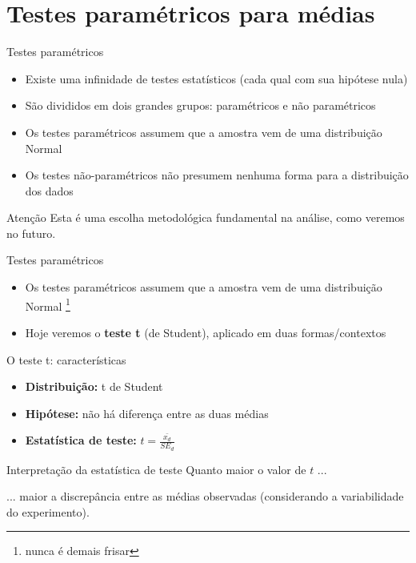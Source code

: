 \documentclass{beamer}
\begin{document}
\section{Testes paramétricos para médias}

\begin{frame}{\scriptsize Testes paramétricos}
  \begin{itemize}
    \footnotesize
  \item Existe uma infinidade de testes estatísticos (cada qual com sua hipótese nula)
  \item São divididos em dois grandes grupos: paramétricos e não paramétricos
  \item Os testes paramétricos assumem que a amostra vem de uma \alert{distribuição Normal}
  \item Os testes não-paramétricos não presumem nenhuma forma para a distribuição dos dados
  \end{itemize}
  \begin{block}{Atenção}
    Esta é uma escolha metodológica fundamental na análise, como veremos no futuro.
  \end{block}
\end{frame}

\begin{frame}{\scriptsize Testes paramétricos}
  \begin{itemize}
    \footnotesize
  \item Os testes paramétricos assumem que a amostra vem de uma \alert{distribuição Normal} \footnote{nunca é demais frisar}
  \item Hoje veremos o {\bf teste t} (de Student), aplicado em duas formas/contextos
  \end{itemize}
\end{frame}

\begin{frame}{\scriptsize O teste t: características}
  \begin{itemize}
    \footnotesize
  \item {\bf Distribuição:} t de Student
  \item {\bf Hipótese:} não há diferença entre as duas médias
  \item {\bf Estatística de teste:} $t = \frac{\bar{x_d}}{SE_d}$
  \end{itemize}
  \vfill
  \begin{block}{Interpretação da estatística de teste}
    \centering
    Quanto maior o valor de $t$ ...

    \bigskip
    ... maior a \alert{discrepância} entre as médias observadas
    ({\footnotesize considerando a variabilidade do experimento}).
  \end{block}
\end{frame}
\end{document}
